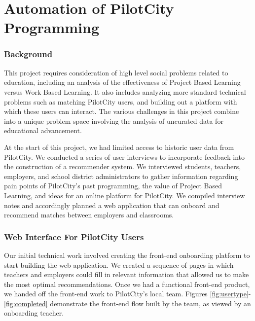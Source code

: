 
\chapter{Automation of PilotCity Programming}%
\label{sec:mathematical-notation}

\subsection{Background}
This project requires consideration of high level social problems related to education, including an analysis of the effectiveness of Project Based Learning versus Work Based Learning. It also includes analyzing more standard technical problems such as matching PilotCity users, and building out a platform with which these users can interact. The various challenges in this project combine into a unique problem space involving the analysis of uncurated data for educational advancement.

At the start of this project, we had limited access to historic user data from PilotCity. We conducted a series of user interviews to incorporate feedback into the construction of a recommender system. We interviewed students, teachers, employers, and school district administrators to gather information regarding pain points of PilotCity's past programming, the value of Project Based Learning, and ideas for an online platform for PilotCity. We compiled interview notes and accordingly planned a web application that can onboard and recommend matches between employers and classrooms. 

\subsection{Web Interface For PilotCity Users}

	Our initial technical work involved creating the front-end onboarding platform to start building the web application. We created a sequence of pages in which teachers and employers could fill in relevant information that allowed us to make the most optimal recommendations. Once we had a functional front-end product, we handed off the front-end work to PilotCity's local team. Figures \ref{fig:usertype}-\ref{fig:completed} demonstrate the front-end flow built by the team, as viewed by an onboarding teacher.
	
